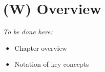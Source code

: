 \section{(W) Overview}\label{s:Overview}
    \emph{To be done here:}
    \begin{itemize}
        \item  Chapter overview 
        \item Notation of key concepts
    \end{itemize}